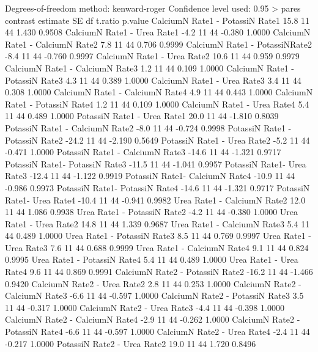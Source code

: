 \documentclass[a4paper,12pt]{article}
\begin{document}
\begin{enumerate}[label=\textbf{\alph*})]
\begin{MyVerbatim}
Degrees-of-freedom method: kenward-roger 
Confidence level used: 0.95 
> pares
contrast                           estimate SE df t.ratio p.value
CalciumN Rate1 - PotassiN Rate1     15.8 11 44   1.430  0.9508
CalciumN Rate1 - Urea Rate1         -4.2 11 44  -0.380  1.0000
CalciumN Rate1 - CalciumN Rate2      7.8 11 44   0.706  0.9999
CalciumN Rate1 - PotassiNRate2      -8.4 11 44  -0.760  0.9997
CalciumN Rate1 - Urea Rate2         10.6 11 44   0.959  0.9979
CalciumN Rate1 - CalciumN Rate3      1.2 11 44   0.109  1.0000
CalciumN Rate1 - PotassiN Rate3      4.3 11 44   0.389  1.0000
CalciumN Rate1 - Urea Rate3          3.4 11 44   0.308  1.0000
CalciumN Rate1 - CalciumN Rate4      4.9 11 44   0.443  1.0000
CalciumN Rate1 - PotassiN Rate4      1.2 11 44   0.109  1.0000
CalciumN Rate1 - Urea Rate4          5.4 11 44   0.489  1.0000
PotassiN Rate1 - Urea Rate1         20.0 11 44  -1.810  0.8039
PotassiN Rate1 - CalciumN Rate2     -8.0 11 44  -0.724  0.9998
PotassiN Rate1 - PotassiN Rate2    -24.2 11 44  -2.190  0.5649
PotassiN Rate1 - Urea Rate2         -5.2 11 44  -0.471  1.0000
PotassiN Rate1 - CalciumN Rate3    -14.6 11 44  -1.321  0.9717
PotassiN Rate1- PotassiN Rate3     -11.5 11 44  -1.041  0.9957
PotassiN Rate1- Urea Rate3         -12.4 11 44  -1.122  0.9919
PotassiN Rate1- CalciumN Rate4     -10.9 11 44  -0.986  0.9973
PotassiN Rate1- PotassiN Rate4     -14.6 11 44  -1.321  0.9717
PotassiN Rate1- Urea Rate4         -10.4 11 44  -0.941  0.9982
Urea Rate1 - CalciumN Rate2         12.0 11 44   1.086  0.9938
Urea Rate1 - PotassiN Rate2         -4.2 11 44  -0.380  1.0000
Urea Rate1 - Urea Rate2             14.8 11 44   1.339  0.9687
Urea Rate1 - CalciumN Rate3          5.4 11 44   0.489  1.0000
Urea Rate1 - PotassiN Rate3          8.5 11 44   0.769  0.9997
Urea Rate1 - Urea Rate3              7.6 11 44   0.688  0.9999
Urea Rate1 - CalciumN Rate4          9.1 11 44   0.824  0.9995
Urea Rate1 - PotassiN Rate4          5.4 11 44   0.489  1.0000
Urea Rate1 - Urea Rate4              9.6 11 44   0.869  0.9991
CalciumN Rate2 - PotassiN Rate2    -16.2 11 44  -1.466  0.9420
CalciumN Rate2 - Urea Rate2          2.8 11 44   0.253  1.0000
CalciumN Rate2 - CalciumN Rate3     -6.6 11 44  -0.597  1.0000
CalciumN Rate2 - PotassiN Rate3      3.5 11 44  -0.317  1.0000
CalciumN Rate2 - Urea Rate3         -4.4 11 44  -0.398  1.0000
CalciumN Rate2 - CalciumN Rate4     -2.9 11 44  -0.262  1.0000
CalciumN Rate2 - PotassiN Rate4     -6.6 11 44  -0.597  1.0000
CalciumN Rate2 - Urea Rate4         -2.4 11 44  -0.217  1.0000
PotassiN Rate2 - Urea Rate2         19.0 11 44   1.720  0.8496

\end{MyVerbatim}
\end{enumerate}
\end{document}
